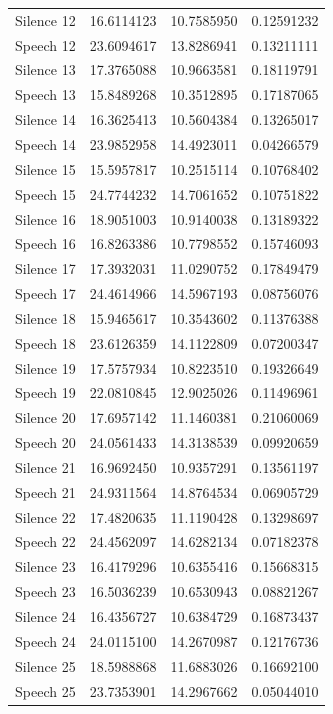 \documentclass[12pt]{article} %
\begin{document}
\begin{center}
\begin{longtable}{llll}
 Silence 12  &  16.6114123&  10.7585950&  0.12591232\\ 
 Speech 12  &  23.6094617&  13.8286941&  0.13211111\\ 
 Silence 13  &  17.3765088&  10.9663581&  0.18119791\\ 
 Speech 13  &  15.8489268&  10.3512895&  0.17187065\\ 
 Silence 14  &  16.3625413&  10.5604384&  0.13265017\\ 
 Speech 14  &  23.9852958&  14.4923011&  0.04266579\\ 
 Silence 15  &  15.5957817&  10.2515114&  0.10768402\\ 
 Speech 15  &  24.7744232&  14.7061652&  0.10751822\\ 
 Silence 16  &  18.9051003&  10.9140038&  0.13189322\\ 
 Speech 16  &  16.8263386&  10.7798552&  0.15746093\\ 
 Silence 17  &  17.3932031&  11.0290752&  0.17849479\\ 
 Speech 17  &  24.4614966&  14.5967193&  0.08756076\\ 
 Silence 18  &  15.9465617&  10.3543602&  0.11376388\\ 
 Speech 18  &  23.6126359&  14.1122809&  0.07200347\\ 
 Silence 19  &  17.5757934&  10.8223510&  0.19326649\\ 
 Speech 19  &  22.0810845&  12.9025026&  0.11496961\\ 
 Silence 20  &  17.6957142&  11.1460381&  0.21060069\\ 
 Speech 20  &  24.0561433&  14.3138539&  0.09920659\\ 
 Silence 21  &  16.9692450&  10.9357291&  0.13561197\\ 
 Speech 21  &  24.9311564&  14.8764534&  0.06905729\\ 
 Silence 22  &  17.4820635&  11.1190428&  0.13298697\\ 
 Speech 22  &  24.4562097&  14.6282134&  0.07182378\\ 
 Silence 23  &  16.4179296&  10.6355416&  0.15668315\\ 
 Speech 23  &  16.5036239&  10.6530943&  0.08821267\\ 
 Silence 24  &  16.4356727&  10.6384729&  0.16873437\\ 
 Speech 24  &  24.0115100&  14.2670987&  0.12176736\\ 
 Silence 25  &  18.5988868&  11.6883026&  0.16692100\\ 
 Speech 25  &  23.7353901&  14.2967662&  0.05044010\\ 

\end{longtable}
\end{center}
\end{document}
